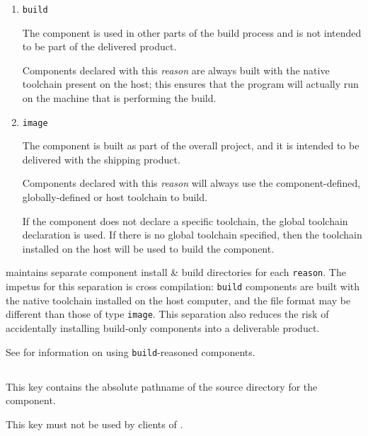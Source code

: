   \begin{enumerate}
  \item \texttt{build}

    The component is used in other parts of the build process and is
    not intended to be part of the delivered product.

    Components declared with this \emph{reason} are always built with
    the native toolchain present on the host; this ensures that the
    program will actually run on the machine that is performing the
    build.

  \item \texttt{image}

    The component is built as part of the overall project, and it is
    intended to be delivered with the shipping product.

    Components declared with this \emph{reason} will always use the
    component-defined, globally-defined or host toolchain to build.

    If the component does not declare a specific toolchain, the global
    toolchain declaration is used.  If there is no global toolchain
    specified, then the toolchain installed on the host will be used
    to build the component.

  \end{enumerate}

  \lmsbw maintains separate component install \& build directories for
  each \texttt{reason}.  The impetus for this separation is cross
  compilation: \texttt{build} components are built with the native
  toolchain installed on the host computer, and the file format may be
  different than those of type \texttt{image}.  This separation also
  reduces the risk of accidentally installing build-only components
  into a deliverable product.

  See  for information on using
  \texttt{build}-reasoned components.


\subsection{}\label{variables:source-directory}

This key contains the absolute pathname of the source directory for
the component.

This key must not be used by clients of \lmsbw.

